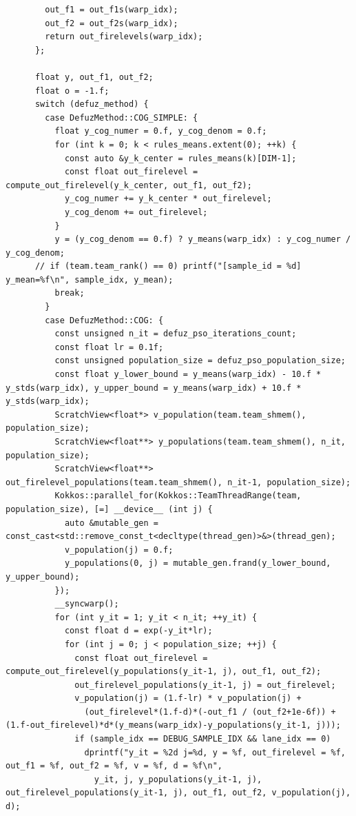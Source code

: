 \begin{verbatim}
        out_f1 = out_f1s(warp_idx);
        out_f2 = out_f2s(warp_idx);
        return out_firelevels(warp_idx);
      };

      float y, out_f1, out_f2;
      float o = -1.f;
      switch (defuz_method) {
        case DefuzMethod::COG_SIMPLE: {
          float y_cog_numer = 0.f, y_cog_denom = 0.f;
          for (int k = 0; k < rules_means.extent(0); ++k) {
            const auto &y_k_center = rules_means(k)[DIM-1];
            const float out_firelevel = compute_out_firelevel(y_k_center, out_f1, out_f2);
            y_cog_numer += y_k_center * out_firelevel;
            y_cog_denom += out_firelevel;
          }
          y = (y_cog_denom == 0.f) ? y_means(warp_idx) : y_cog_numer / y_cog_denom;
      // if (team.team_rank() == 0) printf("[sample_id = %d] y_mean=%f\n", sample_idx, y_mean);
          break;
        }
        case DefuzMethod::COG: {
          const unsigned n_it = defuz_pso_iterations_count;
          const float lr = 0.1f;
          const unsigned population_size = defuz_pso_population_size;
          const float y_lower_bound = y_means(warp_idx) - 10.f * y_stds(warp_idx), y_upper_bound = y_means(warp_idx) + 10.f * y_stds(warp_idx);
          ScratchView<float*> v_population(team.team_shmem(), population_size);
          ScratchView<float**> y_populations(team.team_shmem(), n_it, population_size);
          ScratchView<float**> out_firelevel_populations(team.team_shmem(), n_it-1, population_size);
          Kokkos::parallel_for(Kokkos::TeamThreadRange(team, population_size), [=] __device__ (int j) {
            auto &mutable_gen = const_cast<std::remove_const_t<decltype(thread_gen)>&>(thread_gen);
            v_population(j) = 0.f;
            y_populations(0, j) = mutable_gen.frand(y_lower_bound, y_upper_bound);
          });
          __syncwarp();
          for (int y_it = 1; y_it < n_it; ++y_it) {
            const float d = exp(-y_it*lr);
            for (int j = 0; j < population_size; ++j) {
              const float out_firelevel = compute_out_firelevel(y_populations(y_it-1, j), out_f1, out_f2);
              out_firelevel_populations(y_it-1, j) = out_firelevel;
              v_population(j) = (1.f-lr) * v_population(j) + 
                (out_firelevel*(1.f-d)*(-out_f1 / (out_f2+1e-6f)) + (1.f-out_firelevel)*d*(y_means(warp_idx)-y_populations(y_it-1, j)));
              if (sample_idx == DEBUG_SAMPLE_IDX && lane_idx == 0)
                dprintf("y_it = %2d j=%d, y = %f, out_firelevel = %f, out_f1 = %f, out_f2 = %f, v = %f, d = %f\n",
                  y_it, j, y_populations(y_it-1, j), out_firelevel_populations(y_it-1, j), out_f1, out_f2, v_population(j), d);

\end{verbatim}
